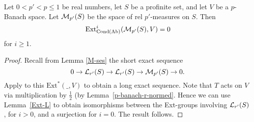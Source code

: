 \begin{theorem}
  \label{main-thm}
  \leanok
  Let $0 < p' < p \le 1$ be real numbers,
  let $S$ be a profinite set,
  and let $V$ be a $p$-Banach space.
  Let $\mathcal M_{p'}(S)$ be the space of rel $p'$-measures on $S$. Then
  \[
\operatorname{Ext}^i_{\operatorname{Cond}(\operatorname{Ab})}(\mathcal M_{p'}(S),V) = 0
\]
  for $i \ge 1$.
\end{theorem}

\begin{proof}
  \leanok
  Recall from Lemma \ref{M-ses} the short exact sequence
  \[ 0 \to \mathcal L_{r'}(S) \to \mathcal L_{r'}(S) \to \mathcal M_{p'}(S) \to 0. \]
  Apply to this $\text{Ext}^*(\_, V)$ to obtain a long exact sequence.
  Note that $T$ acts on $V$ via multiplication by $\tfrac12$ (by Lemma~\ref{p-banach-r-normed}.
  Hence we can use Lemma~\ref{Ext-L} to obtain isomorphisms between the Ext-groups involving $\mathcal L_{r'}(S)$, for $i > 0$,
  and a surjection for $i = 0$.
  The result follows.
\end{proof}

